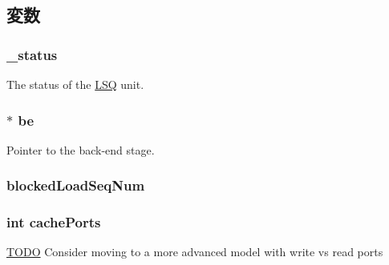 \subsection{変数}
\hypertarget{classOzoneLWLSQ_a6cdf6e6db875a442f3ab6db542bd2bb5}{
\subsubsection[{\_\-status}]{ {\bf \_\-status}}}
\label{classOzoneLWLSQ_a6cdf6e6db875a442f3ab6db542bd2bb5}
The status of the \hyperlink{classLSQ}{LSQ} unit. \hypertarget{classOzoneLWLSQ_a84f815aa1fa864ba2e6d75f5ad2b52d1}{
\subsubsection[{be}]{$\ast$ {\bf be}}}
\label{classOzoneLWLSQ_a84f815aa1fa864ba2e6d75f5ad2b52d1}
Pointer to the back-\/end stage. \hypertarget{classOzoneLWLSQ_a3fca34b247fd8d081557578f8ca60fe3}{
\subsubsection[{blockedLoadSeqNum}]{ {\bf blockedLoadSeqNum}}}
\label{classOzoneLWLSQ_a3fca34b247fd8d081557578f8ca60fe3}
\hypertarget{classOzoneLWLSQ_ab2e23636971c40e7ed945026b2a184e1}{
\subsubsection[{cachePorts}]{\setlength{\rightskip}{0pt plus 5cm}int {\bf cachePorts}}}
\label{classOzoneLWLSQ_ab2e23636971c40e7ed945026b2a184e1}
\begin{Desc}
\item[\hyperlink{todo__todo000047}{TODO}]Consider moving to a more advanced model with write vs read ports \end{Desc}
